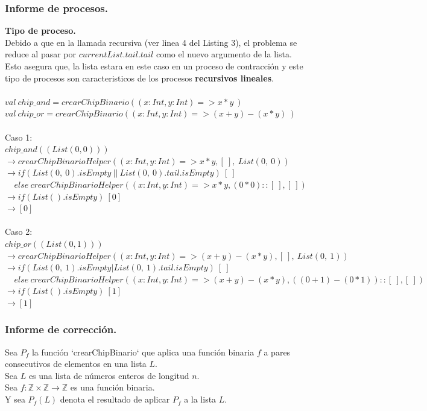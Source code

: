 \documentclass[12pt, a4paper]{article}
\begin{document}
\subsubsection{Informe de procesos.}
\textbf{Tipo de proceso.} \\
Debido a que en la llamada recursiva (ver linea 4 del Listing 3), el problema se reduce al pasar por $currentList.tail.tail$ como el nuevo argumento de la lista. Esto asegura que, la lista estara en este caso en un proceso de contracción y este tipo de procesos son caracteristicos de los procesos \textbf{recursivos lineales}. \\ \\
$val~chip\_and = crearChipBinario((x: Int, y: Int) => x*y~)$ \\
$val~chip\_or = crearChipBinario((x: Int, y: Int) => (x+y)-(x*y)~)$ \\ \\
Caso 1: \\ 
$chip\_and((List(0, 0)))$ \\
$\rightarrow crearChipBinarioHelper((x: Int, y: Int) => x*y, [~], ~List(0,~0))$ \\
$\rightarrow if ( List(0,~0).isEmpty ~||~ List(0, ~0).tail.isEmpty)~[~] $ \\
$~~~~~else~crearChipBinarioHelper((x: Int, y: Int) => x*y,  (0*0)::[~], [~])$ \\
$\rightarrow if (List().isEmpty)~[0] $ \\
$\rightarrow [0]$ \\ \\
Caso 2: \\ 
$chip\_or((List(0, 1)))$ \\
$\rightarrow crearChipBinarioHelper((x: Int, y: Int) => (x+y)-(x*y), [~], ~List(0,~1))$ \\
$\rightarrow if ( List(0,~1).isEmpty | List(0, ~1).tail.isEmpty)~[~] $ \\
$~~~~~else~crearChipBinarioHelper((x: Int, y: Int) => (x+y)-(x*y),  ((0+1)-(0*1))::[~], [~])$ \\
$\rightarrow if (List().isEmpty)~[1] $ \\
$\rightarrow [1]$

\subsubsection{Informe de corrección.}

Sea \( P_f \) la función `crearChipBinario` que aplica una función binaria \( f \) a pares consecutivos de elementos en una lista \( L \). \\
Sea \( L \) es una lista de números enteros de longitud \( n \).\\
Sea \( f: \mathbb{Z} \times \mathbb{Z} \rightarrow \mathbb{Z} \) es una función binaria.\\
Y sea \( P_f(L) \) denota el resultado de aplicar \( P_f \) a la lista \( L \).
\end{document}
